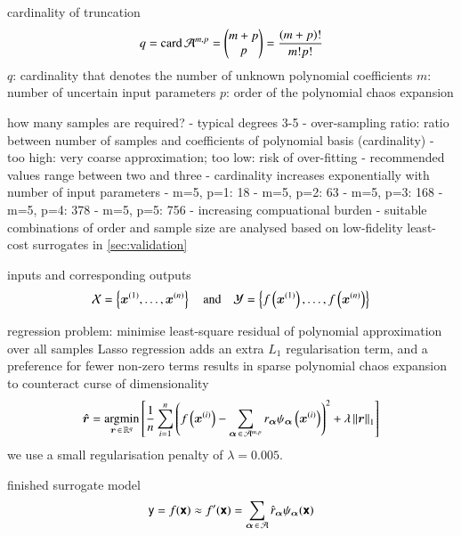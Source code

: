 cardinality of truncation
\begin{equation}
    q = \text{card}\, \mathcal{A}^{m,p} = \left(\begin{matrix}
        m+p \\
        p
    \end{matrix}\right) = \frac{(m+p)!}{m!p!}
\end{equation}
$q$: cardinality that denotes the number of unknown polynomial coefficients
$m$: number of uncertain input parameters
$p$: order of the polynomial chaos expansion

how many samples are required?
- typical degrees 3-5 \cite{gratiet_metamodel-based_2015}
- over-sampling ratio: ratio between number of samples and coefficients of polynomial basis (cardinality) \cite{palar_multi-fidelity_2016}
- too high: very coarse approximation; too low: risk of over-fitting \cite{palar_multi-fidelity_2016}
- recommended values range between two and three \cite{hosder2007,palar_multi-fidelity_2016,fajraoui_optimal_2017,gratiet_metamodel-based_2015}
- cardinality increases exponentially with number of input parameters
  - m=5, p=1: 18
  - m=5, p=2: 63
  - m=5, p=3: 168
  - m=5, p=4: 378
  - m=5, p=5: 756
- increasing compuational burden
- suitable combinations of order and sample size are analysed based on low-fidelity least-cost surrogates in \cref{sec:validation}

inputs and corresponding outputs
\begin{equation}
    \mathcal{X} = \left\{ \bm x^{(1)},\dots,\bm x^{(n)} \right\} \quad\text{and}\quad 
    \mathcal{Y} = \left\{ f\left(\bm x^{(1)}\right),\dots,f\left(\bm x^{(n)}\right) \right\}
\end{equation}

regression problem:
minimise least-square residual of polynomial approximation over all samples
Lasso regression adds an extra $L_1$ regularisation term, and a preference for fewer non-zero terms
results in sparse polynomial chaos expansion to counteract curse of dimensionality \cite{gratiet_metamodel-based_2015}
\begin{equation}
    \hat{\bm{r}} = \operatorname*{\arg\!\min}_{\bm{r} \,\in\, \mathbb{R}^q} \left[ \frac{1}{n} \sum_{i=1}^n \left(
        f\left(\bm x^{(i)}\right) - \sum_{{\bm{\alpha}} \,\in\, \mathcal{A}^{m,p}} r_{\bm{\alpha}} \psi_{\bm{\alpha}}\left(\bm x^{(i)}\right)
    \right)^2  + \lambda \left\lVert\bm{r}\right\rVert_1 \right]
    \label{eq:regression}
\end{equation}
we use a small regularisation penalty of $\lambda=0.005$.

finished surrogate model
\begin{equation}
    \mathsf{y} = f(\boldsymbol{\mathsf{x}}) \approx f'(\boldsymbol{\mathsf{x}}) = \sum_{{\bm{\alpha}} \,\in\, \mathcal{A}} \hat{r}_{\bm{\alpha}} \psi_{\bm{\alpha}} (\boldsymbol{\mathsf{x}})
\end{equation}

